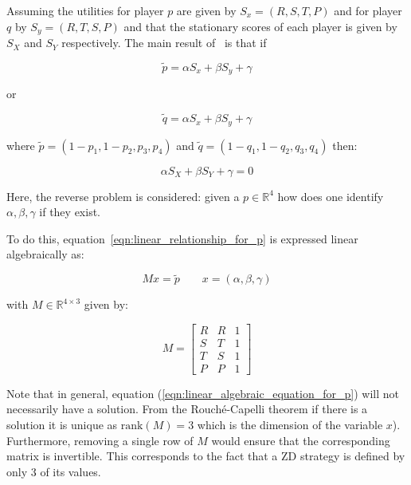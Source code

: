 \documentclass[a4paper]{article}
\begin{document}
Assuming the utilities for player \(p\) are given by \(S_x=(R, S, T, P)\) and
for player \(q\) by \(S_y=(R, T, S, P)\) and that the stationary scores of each
player is given by \(S_X\) and \(S_Y\) respectively. The main result
of~\cite{Press2012} is that if

\begin{equation}\label{eqn:linear_relationship_for_p}
    \tilde p=\alpha S_x + \beta S_y + \gamma
\end{equation}

or

\begin{equation}\label{eqn:linear_relationship_for_q}
    \tilde q=\alpha S_x + \beta S_y + \gamma
\end{equation}

where \(\tilde p = (1 - p_1, 1 - p_2, p_3, p_4)\) and
\(\tilde q = (1 - q_1, 1 - q_2, q_3, q_4)\) then:

\begin{equation}
    \alpha S_X + \beta S_Y + \gamma = 0
\end{equation}

Here, the reverse problem is considered: given a
\(p\in\mathbb{R}^4\) how does one identify \(\alpha, \beta, \gamma\) if they
exist.

To do this, equation~\ref{eqn:linear_relationship_for_p} is expressed linear
algebraically as:

\begin{equation}\label{eqn:linear_algebraic_equation_for_p}
    Mx=\tilde p  \qquad x=(\alpha, \beta, \gamma)
\end{equation}

with \(M\in\mathbb{R}^{4\times 3}\) given by:

\begin{equation}\label{eqn:definition_of_M}
    M =
    \begin{bmatrix}
        R & R & 1\\
        S & T & 1\\
        T & S & 1\\
        P & P & 1
    \end{bmatrix}
\end{equation}

Note that in general, equation (\ref{eqn:linear_algebraic_equation_for_p}) will
not necessarily have a solution. From the Rouché-Capelli theorem if there is a
solution it is unique as \(\text{rank}(M)=3\) which is the dimension of the
variable \(x\)). Furthermore, removing a single row of \(M\) would ensure that
the corresponding matrix is invertible. This corresponds to the fact that a ZD
strategy is defined by only 3 of its values.
\end{document}
